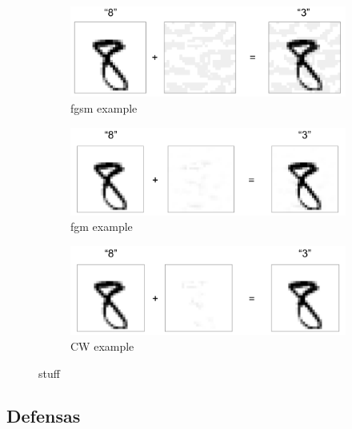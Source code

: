 \begin{figure}[h!]
    \centering
    \begin{subfigure}[b]{0.55\textwidth}
        \centering
        \includegraphics[width=\textwidth]{images/fgms_example.png}
        \caption{fgsm example}
        \label{fgsm_example}
    \end{subfigure}
    \begin{subfigure}[b]{0.55\textwidth}
        \centering
        \includegraphics[width=\textwidth]{images/fgm_example.png}
        \caption{fgm example}
        \label{fgm_example}
    \end{subfigure}
    \begin{subfigure}[b]{0.55\textwidth}
        \centering
        \includegraphics[width=\textwidth]{images/CW_example.png}
        \caption{CW example}
        \label{CW_example}
    \end{subfigure}
    \label{attack_examples}
    \caption{stuff}
\end{figure}

\subsection{Defensas}

